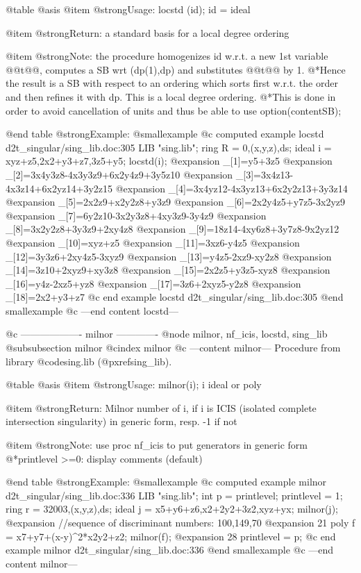 @table @asis
@item @strong{Usage:}
locstd (id); id = ideal

@item @strong{Return:}
a standard basis for a local degree ordering

@item @strong{Note:}
the procedure homogenizes id w.r.t. a new 1st variable @@t@@, computes
a SB wrt (dp(1),dp) and substitutes @@t@@ by 1.
@*Hence the result is a SB with respect to an ordering which sorts
first w.r.t. the order and then refines it with dp. This is a
local degree ordering.
@*This is done in order to avoid cancellation of units and thus
be able to use option(contentSB);

@end table
@strong{Example:}
@smallexample
@c computed example locstd d2t_singular/sing_lib.doc:305 
LIB "sing.lib";
ring R = 0,(x,y,z),ds;
ideal i  = xyz+z5,2x2+y3+z7,3z5+y5;
locstd(i);
@expansion{} _[1]=y5+3z5
@expansion{} _[2]=3x4y3z8-4x3y3z9+6x2y4z9+3y5z10
@expansion{} _[3]=3x4z13-4x3z14+6x2yz14+3y2z15
@expansion{} _[4]=3x4yz12-4x3yz13+6x2y2z13+3y3z14
@expansion{} _[5]=2x2z9+x2y2z8+y3z9
@expansion{} _[6]=2x2y4z5+y7z5-3x2yz9
@expansion{} _[7]=6y2z10-3x2y3z8+4xy3z9-3y4z9
@expansion{} _[8]=3x2y2z8+3y3z9+2xy4z8
@expansion{} _[9]=18z14-4xy6z8+3y7z8-9x2yz12
@expansion{} _[10]=xyz+z5
@expansion{} _[11]=3xz6-y4z5
@expansion{} _[12]=3y3z6+2xy4z5-3xyz9
@expansion{} _[13]=y4z5-2xz9-xy2z8
@expansion{} _[14]=3z10+2xyz9+xy3z8
@expansion{} _[15]=2x2z5+y3z5-xyz8
@expansion{} _[16]=y4z-2xz5+yz8
@expansion{} _[17]=3z6+2xyz5-y2z8
@expansion{} _[18]=2x2+y3+z7
@c end example locstd d2t_singular/sing_lib.doc:305
@end smallexample
@c ---end content locstd---

@c ------------------- milnor -------------
@node milnor, nf_icis, locstd, sing_lib
@subsubsection milnor
@cindex milnor
@c ---content milnor---
Procedure from library @code{sing.lib} (@pxref{sing_lib}).

@table @asis
@item @strong{Usage:}
milnor(i); i ideal or poly

@item @strong{Return:}
Milnor number of i, if i is ICIS (isolated complete intersection
singularity) in generic form, resp. -1 if not

@item @strong{Note:}
use proc nf_icis to put generators in generic form
@*printlevel >=0: display comments (default)

@end table
@strong{Example:}
@smallexample
@c computed example milnor d2t_singular/sing_lib.doc:336 
LIB "sing.lib";
int p      = printlevel;
printlevel = 1;
ring r     = 32003,(x,y,z),ds;
ideal j    = x5+y6+z6,x2+2y2+3z2,xyz+yx;
milnor(j);
@expansion{} //sequence of discriminant numbers: 100,149,70
@expansion{} 21
poly f     = x7+y7+(x-y)^2*x2y2+z2;
milnor(f);
@expansion{} 28
printlevel = p;
@c end example milnor d2t_singular/sing_lib.doc:336
@end smallexample
@c ---end content milnor---

